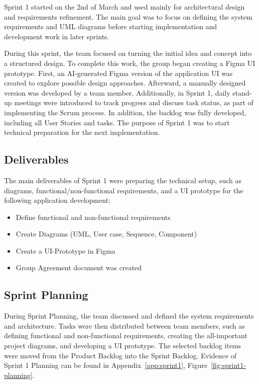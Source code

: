 Sprint 1 started on the 2nd of March and used mainly for architectural design and requirements refinement. The main goal was to focus on defining the system  requirements and UML diagrams before starting implementation and development work in later sprints. 

During this sprint, the team focused on turning the initial idea and concept into a structured design. To complete this work, the group began creating a Figma UI prototype. First, an AI-generated Figma version of the application UI was created to explore possible design approaches. Afterward, a manually designed version was developed by a team member. Additionally, in Sprint 1, daily stand-up meetings were introduced to track progress and discuss task status, as part of implementing the Scrum process. In addition, the backlog was fully developed, including all User Stories and tasks. The purpose of Sprint 1 was to start technical preparation for the next implementation.

 

\subsection*{Deliverables}

The main deliverables of Sprint 1 were preparing the technical setup, such as diagrams, functional/non-functional requirements, and a UI prototype for the following application development:

 \begin{itemize}
    \item Define functional and non-functional requirements
    \item Create Diagrams (UML, User case, Sequence, Component)
    \item Create a UI-Prototype in Figma

  \item Group Agreement document was created

\end{itemize}


\subsection*{Sprint Planning}

During Sprint Planning, the team discussed and defined the system requirements and architecture. Tasks were then  distributed between team members, such as defining functional and non-functional requirements, creating the all-important project diagrams, and developing a UI prototype. The selected backlog items were moved from the Product Backlog into the Sprint Backlog. Evidence of Sprint 1 Planning can be found in Appendix~\ref{app:sprint1}, Figure~\ref{fig:sprint1-planning}.

